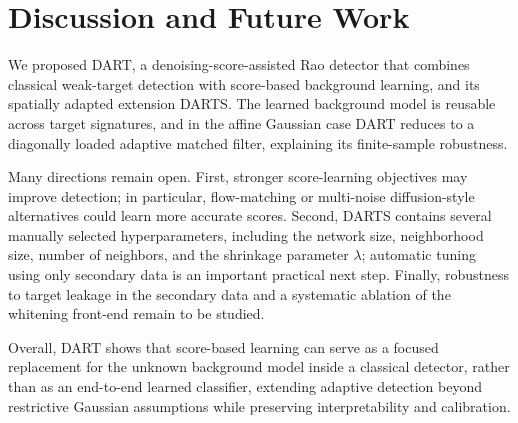 \chapter{Discussion and Future Work}
\label{chap:conclusion}
\label{sec:discussion}

We proposed DART, a denoising-score-assisted Rao detector that combines
classical weak-target detection with score-based background learning, and
its spatially adapted extension DARTS. The learned background model is
reusable across target signatures, and in the affine Gaussian case DART
reduces to a diagonally loaded adaptive matched filter, explaining its
finite-sample robustness.

Many directions remain open. First, stronger score-learning objectives may
improve detection; in particular, flow-matching or multi-noise
diffusion-style alternatives could learn more accurate scores. Second,
DARTS contains several manually selected hyperparameters, including the
network size, neighborhood size, number of neighbors, and
the shrinkage parameter $\lambda$; automatic tuning using only secondary
data is an important practical next step. Finally, robustness to target
leakage in the secondary data and a systematic ablation of the whitening
front-end remain to be studied.

Overall, DART shows that score-based learning can serve as a focused
replacement for the unknown background model inside a classical detector,
rather than as an end-to-end learned classifier, extending adaptive
detection beyond restrictive Gaussian assumptions while preserving
interpretability and calibration.

